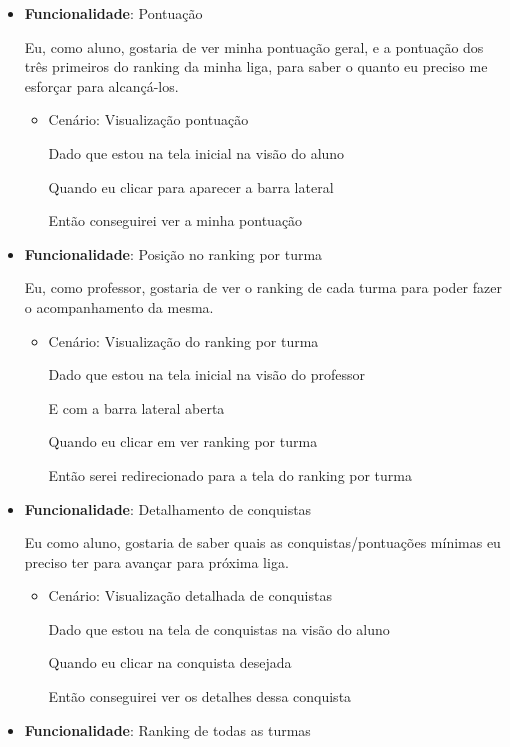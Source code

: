 \begin{itemize}
\item\textbf{Funcionalidade}: Pontuação
    
    Eu, como aluno, gostaria de ver minha pontuação geral, e a pontuação dos três primeiros do ranking da minha liga, para saber o quanto eu preciso me esforçar para alcançá-los.
    \begin{itemize}
        \item Cenário: Visualização pontuação
        \par Dado que estou na tela inicial na visão do aluno
        \par Quando eu clicar para aparecer a barra lateral
        \par Então conseguirei ver a minha pontuação
    \end{itemize}  
 
\item\textbf{Funcionalidade}: Posição no ranking por turma
    
    Eu, como professor, gostaria de ver o ranking de cada turma para poder fazer o acompanhamento da mesma.
    \begin{itemize}
        \item Cenário: Visualização do ranking por turma
        \par Dado que estou na tela inicial na visão do professor
        \par E com a barra lateral aberta
        \par Quando eu clicar em ver ranking por turma
        \par Então serei redirecionado para a tela do ranking por turma
    \end{itemize}  

\item\textbf{Funcionalidade}: Detalhamento de conquistas
    
    Eu como aluno, gostaria de saber quais as conquistas/pontuações mínimas eu preciso ter para avançar para próxima liga.
    \begin{itemize}
        \item Cenário: Visualização detalhada de conquistas  
        \par Dado que estou na tela de conquistas na visão do aluno
        \par Quando eu clicar na conquista desejada
        \par Então conseguirei ver os detalhes dessa conquista
    \end{itemize}  

\item\textbf{Funcionalidade}: Ranking de todas as turmas
    

\end{itemize}

